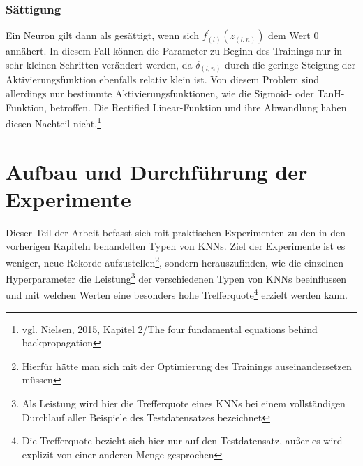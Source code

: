 \documentclass[a4paper,12pt,ngerman,oneside]{scrreprt}	%
\begin{document}
			\subsection{Sättigung}\label{Sättigung}
			Ein Neuron gilt dann als gesättigt, wenn sich $f_{(l)}^{\prime}(z_{(l,n)})$ dem Wert 0 annähert. In diesem Fall können die Parameter zu Beginn des Trainings nur in sehr kleinen Schritten verändert werden, da $\delta_{(l,n)}$ durch die geringe Steigung der Aktivierungsfunktion ebenfalls relativ klein ist. Von diesem Problem sind allerdings nur bestimmte Aktivierungsfunktionen, wie die Sigmoid- oder TanH-Funktion, betroffen. Die Rectified Linear-Funktion und ihre Abwandlung haben diesen Nachteil nicht.\footnote{vgl. Nielsen, 2015, Kapitel 2/The four fundamental equations behind backpropagation}
			
	
		
		
	\chapter{Aufbau und Durchführung der Experimente} \label{Experimente}
	Dieser Teil der Arbeit befasst sich mit praktischen Experimenten zu den in den vorherigen Kapiteln behandelten Typen von KNNs. Ziel der Experimente ist es weniger, neue Rekorde aufzustellen\footnote{Hierfür hätte man sich mit der Optimierung des Trainings auseinandersetzen müssen}, sondern herauszufinden, wie die einzelnen Hyperparameter die Leistung\footnote{Als Leistung wird hier die Trefferquote eines KNNs bei einem vollständigen Durchlauf aller Beispiele des Testdatensatzes bezeichnet} der verschiedenen Typen von KNNs beeinflussen und mit welchen Werten eine besonders hohe Trefferquote\footnote{Die Trefferquote bezieht sich hier nur auf den Testdatensatz, außer es wird explizit von einer anderen Menge gesprochen} erzielt werden kann. 
	
\end{document}
